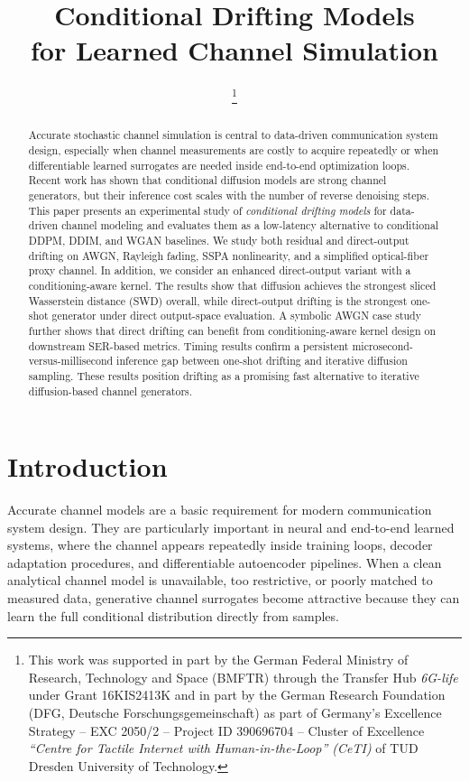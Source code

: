 \documentclass[conference]{IEEEtran}
\title{Conditional Drifting Models \\for Learned Channel Simulation}
\author{
\IEEEauthorblockN{Rick Fritschek and Rafael F. Schaefer}
\IEEEauthorblockA{Chair of Information Theory and Machine Learning\\ Technische Universität Dresden, Germany%
}
\thanks{This work was supported in part by the German Federal Ministry of Research, Technology and Space (BMFTR) through the Transfer Hub \emph{6G-life} under Grant 16KIS2413K and in part by the German Research Foundation (DFG, Deutsche Forschungsgemeinschaft) as part of Germany's Excellence Strategy -- EXC 2050/2 -- Project ID 390696704 -- Cluster of Excellence \emph{``Centre for Tactile Internet with Human-in-the-Loop'' (CeTI)} of TUD Dresden University of Technology.}
}
\begin{document}
\maketitle

\begin{abstract}
Accurate stochastic channel simulation is central to data-driven communication system design, especially when channel measurements are costly to acquire repeatedly or when differentiable learned surrogates are needed inside end-to-end optimization loops.
Recent work has shown that conditional diffusion models are strong channel generators, but their inference cost scales with the number of reverse denoising steps.
This paper presents an experimental study of \emph{conditional drifting models} for data-driven channel modeling and evaluates them as a low-latency alternative to conditional DDPM, DDIM, and WGAN baselines.
We study both residual and direct-output drifting on AWGN, Rayleigh fading, SSPA nonlinearity, and a simplified optical-fiber proxy channel. In addition, we consider an enhanced direct-output variant with a conditioning-aware kernel. The results show that diffusion achieves the strongest sliced Wasserstein distance (SWD) overall, while direct-output drifting is the strongest one-shot generator under direct output-space evaluation.
A symbolic AWGN case study further shows that direct drifting can benefit from conditioning-aware kernel design on downstream SER-based metrics.
Timing results confirm a persistent microsecond-versus-millisecond inference gap between one-shot drifting and iterative diffusion sampling.
These results position drifting as a promising fast alternative to iterative diffusion-based channel generators.
\end{abstract}


\section{Introduction}
Accurate channel models are a basic requirement for modern communication system design.
They are particularly important in neural and end-to-end learned systems, where the channel appears repeatedly inside training loops, decoder adaptation procedures, and differentiable autoencoder pipelines.
When a clean analytical channel model is unavailable, too restrictive, or poorly matched to measured data, generative channel surrogates become attractive because they can learn the full conditional distribution directly from samples.
\end{document}
